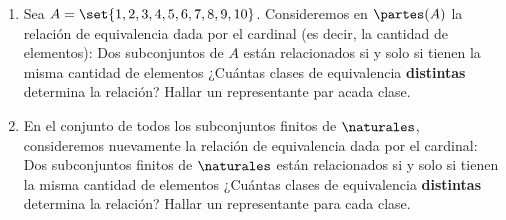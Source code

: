\begin{enunciado}{\ejercicio}

  \begin{enumerate}[label=\roman*)]
    \item
          Sea $A = \set{1, 2, 3, 4, 5, 6, 7, 8, 9, 10}$. Consideremos en $\partes(A)$ la relación de equivalencia dada
          por el cardinal (es decir, la cantidad de elementos): Dos subconjuntos de $A$ están relacionados si y solo si
          tienen la misma cantidad de elementos ¿Cuántas clases de equivalencia \textbf{distintas}
          determina la relación? Hallar un representante par acada clase.

    \item
          En el conjunto de todos los subconjuntos finitos de $\naturales$, consideremos nuevamente la relación
          de equivalencia dada por el cardinal: Dos subconjuntos finitos de $\naturales$ están relacionados
          si y solo si tienen la misma cantidad de elementos ¿Cuántas clases de equivalencia
          \textbf{distintas} determina la relación?
          Hallar un representante para cada clase.
  \end{enumerate}
\end{enunciado}

